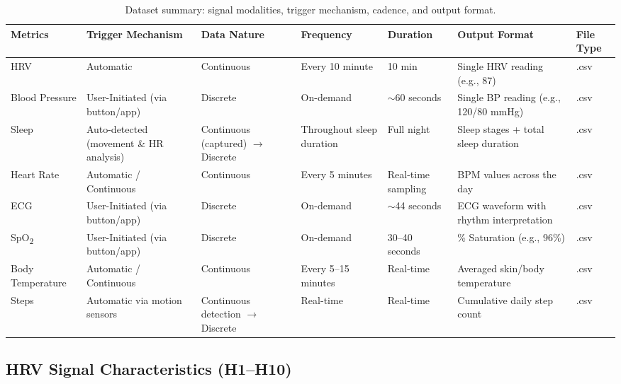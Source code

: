 \documentclass[11pt, a4paper]{article}
\theoremstyle{plain}
\theoremstyle{definition}
\begin{document}
\begin{table}[h!]
\centering
\caption{Dataset summary: signal modalities, trigger mechanism, cadence, and output format.}
\label{tab:dataset-summary}
\small
\begin{tabular}{p{2.2cm} p{2.6cm} p{1.8cm} p{1.8cm} p{1.6cm} p{2.6cm} p{1.0cm}}
\toprule
\textbf{Metrics} & \textbf{Trigger Mechanism} & \textbf{Data Nature} & \textbf{Frequency} & \textbf{Duration} & \textbf{Output Format} & \textbf{File Type} \\
\midrule
HRV & Automatic & Continuous & Every 10 minute & 10 min & Single HRV reading (e.g., 87) & .csv \\
Blood Pressure & User-Initiated (via button/app) & Discrete & On-demand & $\sim$60 seconds & Single BP reading (e.g., 120/80 mmHg) & .csv \\
Sleep & Auto-detected (movement \& HR analysis) & Continuous (captured) $\rightarrow$ Discrete & Throughout sleep duration & Full night & Sleep stages + total sleep duration & .csv \\
Heart Rate & Automatic / Continuous & Continuous & Every 5 minutes & Real-time sampling & BPM values across the day & .csv \\
ECG & User-Initiated (via button/app) & Discrete & On-demand & $\sim$44 seconds & ECG waveform with rhythm interpretation & .csv \\
SpO\textsubscript{2} & User-Initiated (via button/app) & Discrete & On-demand & 30--40 seconds & \% Saturation (e.g., 96\%) & .csv \\
Body Temperature & Automatic / Continuous & Continuous & Every 5--15 minutes & Real-time & Averaged skin/body temperature & .csv \\
Steps & Automatic via motion sensors & Continuous detection $\rightarrow$ Discrete & Real-time & Real-time & Cumulative daily step count & .csv \\
\bottomrule
\end{tabular}
\end{table}

\subsection{HRV Signal Characteristics (H1--H10)}
\end{document}
